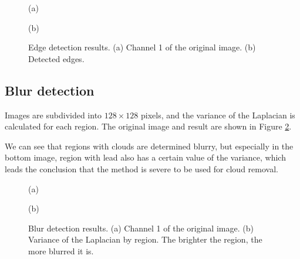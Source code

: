 \documentclass{article}
\begin{document}
        \begin{figure}[ht]
            \centering
            \begin{minipage}{0.49\hsize}
                \centering
                \caption*{(a)}
            \end{minipage}
            \begin{minipage}{0.49\hsize}
                \centering
                \caption*{(b)}
            \end{minipage}
            \caption{
                Edge detection results.
                (a) Channel 1 of the original image.
                (b) Detected edges.
            }
            \label{fig:edge}
        \end{figure}

    \subsection{Blur detection}
        Images are subdivided into $128 \times 128$ pixels,
        and the variance of the Laplacian is calculated for each region.
        The original image and result are shown in Figure \ref{fig:blur}.

        We can see that regions with clouds are determined blurry,
        but especially in the bottom image,
        region with lead also has a certain value of the variance,
        which leads the conclusion that the method is severe to be used for cloud removal.

        \begin{figure}[ht]
            \centering
            \begin{minipage}{0.49\hsize}
                \centering
                \caption*{(a)}
            \end{minipage}
            \begin{minipage}{0.49\hsize}
                \centering
                \caption*{(b)}
            \end{minipage}
            \caption{
                Blur detection results.
                (a) Channel 1 of the original image.
                (b) Variance of the Laplacian by region.
                The brighter the region, the more blurred it is.
            }
            \label{fig:blur}
        \end{figure}
\end{document}
